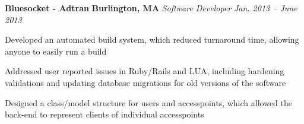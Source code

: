 \item
\headerrow
{\textbf{Bluesocket - Adtran}}
{\textbf{Burlington, MA}}
\headerrow
{\emph{Software Developer}}
{\emph{Jan. 2013 -- June 2013}}
\begin{itemize*}
    \item Developed an automated build system, which reduced turnaround time,
    allowing anyone to easily run a build
    \item Addressed user reported issues in Ruby/Rails and LUA, including
    hardening validations and updating database migrations for old versions
    of the software
    \item Designed a class/model structure for users and accesspoints, which
    allowed the back-end to represent clients of individual accesspoints
\end{itemize*}

